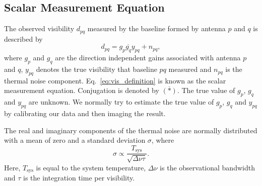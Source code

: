 \documentclass[useAMS,usenatbib]{mn2e}
\newcommand{\conj}[1]{\overline{#1}}
\begin{document}
\subsection{Scalar Measurement Equation}
\label{sec:s_mes}
The observed visibility $d_{pq}$ measured by the baseline formed by antenna $p$ and $q$ is described by
\begin{equation}
\label{eq:vis_definition}
d_{pq} = g_{p}\conj{g_q}y_{pq} + n_{pq},
\end{equation}
where $g_{p}$ and $g_{q}$ are the direction independent gains associated with antenna $p$ and $q$, $y_{pq}$ denotes the true visibility that baseline $pq$ measured
and $n_{pq}$ is the thermal noise component. Eq.~\eqref{eq:vis_definition} is known as the scalar measurement equation. Conjugation is denoted by $\conj{(*)}$. The true value of $g_p$, $g_q$ and $y_{pq}$ are unknown. We normally try to estimate the true value of
$g_p$, $g_q$ and $y_{pq}$ by calibrating our data and then imaging the result.

The real and imaginary components of the thermal noise are normally distributed with a mean of zero and a standard deviation $\sigma$, where   
\begin{equation}
\sigma \propto \frac{T_{\textrm{sys}}}{\sqrt{\Delta \nu \tau}}. 
\end{equation}
Here, $T_{\textrm{sys}}$ is equal to the system temperature, $\Delta \nu$ is the observational bandwidth and $\tau$ is the integration time per visibility. 
\end{document}
